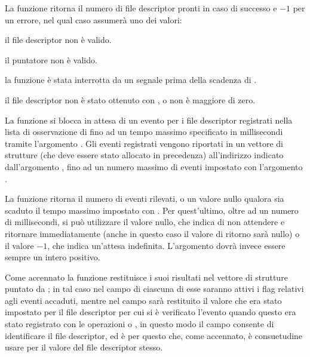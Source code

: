 \begin{funcproto}{

}

{La funzione ritorna il numero di file descriptor pronti in caso di successo e
  $-1$ per un errore, nel qual caso  assumerà uno dei valori:
  \begin{errlist}
  \item[\errcode{EBADF}] il file descriptor  non è valido.
  \item[\errcode{EFAULT}] il puntatore  non è valido.
  \item[\errcode{EINTR}] la funzione è stata interrotta da un segnale prima
    della scadenza di .
  \item[\errcode{EINVAL}] il file descriptor  non è stato ottenuto
    con , o  non è maggiore di zero.
  \end{errlist}
}  
\end{funcproto}

La funzione si blocca in attesa di un evento per i file descriptor registrati
nella lista di osservazione di  fino ad un tempo massimo
specificato in millisecondi tramite l'argomento . Gli eventi
registrati vengono riportati in un vettore di strutture 
(che deve essere stato allocato in precedenza) all'indirizzo indicato
dall'argomento , fino ad un numero massimo di eventi impostato
con l'argomento .

La funzione ritorna il numero di eventi rilevati, o un valore nullo qualora
sia scaduto il tempo massimo impostato con . Per quest'ultimo,
oltre ad un numero di millisecondi, si può utilizzare il valore nullo, che
indica di non attendere e ritornare immediatamente (anche in questo caso il
valore di ritorno sarà nullo) o il valore $-1$, che indica un'attesa
indefinita. L'argomento  dovrà invece essere sempre un intero
positivo.

Come accennato la funzione restituisce i suoi risultati nel vettore di
strutture  puntato da ; in tal caso nel
campo  di ciascuna di esse saranno attivi i flag relativi agli
eventi accaduti, mentre nel campo  sarà restituito il valore che era
stato impostato per il file descriptor per cui si è verificato l'evento quando
questo era stato registrato con le operazioni  o
, in questo modo il campo  consente di
identificare il file descriptor, ed è per questo che, come accennato, è
consuetudine usare per  il valore del file descriptor stesso.

